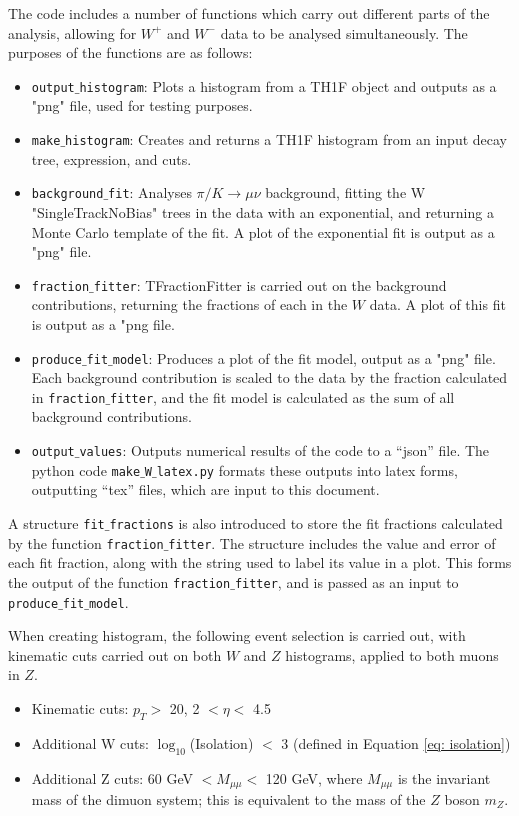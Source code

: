 \documentclass[a4paper]{article}
\begin{document}
The code includes a number of functions which carry out different parts of the analysis, allowing for $W^+$ and $W^-$ data to be analysed simultaneously. The purposes of the functions are as follows:
\begin{itemize}
    \item \texttt{output$\_$histogram}: Plots a histogram from a TH1F object and outputs as a "png" file, used for testing purposes.
    \item \texttt{make$\_$histogram}: Creates and returns a TH1F histogram from an input decay tree, expression, and cuts.
    \item \texttt{background$\_$fit}: Analyses $\pi/K \xrightarrow{} \mu\nu$ background, fitting the W "SingleTrackNoBias" trees in the data with an exponential, and returning a Monte Carlo template of the fit. A plot of the exponential fit is output as a "png" file.
    \item \texttt{fraction$\_$fitter}: TFractionFitter is carried out on the background contributions, returning the fractions of each in the $W$ data. A plot of this fit is output as a "png file. 
    \item \texttt{produce$\_$fit$\_$model}: Produces a plot of the fit model, output as a "png" file. Each background contribution is scaled to the data by the fraction calculated in \texttt{fraction$\_$fitter}, and the fit model is calculated as the sum of all background contributions.
    \item \texttt{output$\_$values}: Outputs numerical results of the code to a ``json'' file. The python code \texttt{make$\_$W$\_$latex.py} formats these outputs into latex forms, outputting ``tex'' files, which are input to this document.
\end{itemize}
A structure \texttt{fit$\_$fractions} is also introduced to store the fit fractions calculated by the function \texttt{fraction$\_$fitter}. The structure includes the value and error of each fit fraction, along with the string used to label its value in a plot. This forms the output of the function \texttt{fraction$\_$fitter}, and is passed as an input to \texttt{produce$\_$fit$\_$model}.

When creating histogram, the following event selection is carried out, with kinematic cuts carried out on both $W$ and $Z$ histograms, applied to both muons in $Z$.
\begin{itemize}
    \item Kinematic cuts: $p_T >$ 20, 2 $< \eta <$ 4.5
    \item Additional W cuts: $\log_{10}$(Isolation) $<$ 3 (defined in Equation \ref{eq: isolation})
    \item Additional Z cuts: 60 GeV $< M_{\mu\mu} <$ 120 GeV, where $M_{\mu\mu}$ is the invariant mass of the dimuon system; this is equivalent to the mass of the $Z$ boson $m_Z$.
\end{itemize}
\end{document}
